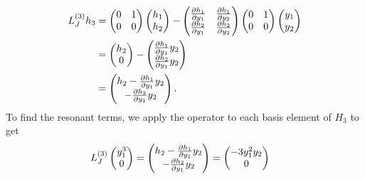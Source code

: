 \documentclass[12pt]{report}
\begin{document}
\begin{solution}
    \begin{align*}
        L_J^{(3)}h_3 &= \begin{pmatrix}
            0  & 1\\ 0 & 0
        \end{pmatrix}\begin{pmatrix}
            h_1 \\ h_2
        \end{pmatrix} - \begin{pmatrix}
            \frac{\partial h_1}{\partial y_1} &  \frac{\partial h_1}{\partial y_2}\\
            \frac{\partial h_2}{\partial y_1} &  \frac{\partial h_2}{\partial y_2}\\
        \end{pmatrix}
        \begin{pmatrix}
            0 & 1\\ 0 & 0
        \end{pmatrix}
        \begin{pmatrix}
            y_1\\y_2
        \end{pmatrix}\\
        &= \begin{pmatrix}
            h_2 \\ 0
        \end{pmatrix} - \begin{pmatrix}
            \frac{\partial h_1}{\partial y_1}y_2\\
            \frac{\partial h_2}{\partial y_1} y_2
        \end{pmatrix}\\
        &=\begin{pmatrix}
            h_2 - \frac{\partial h_1}{\partial y_1}y_2\\
            -\frac{\partial h_2}{\partial y_1} y_2
        \end{pmatrix}.
    \end{align*}
    To find the resonant terms, we apply the operator to each basis element of $H_3$ to get
    \begin{align*}
        L_J^{(3)}
        \begin{pmatrix} 
            y_1^3\\0 
        \end{pmatrix} &= 
        \begin{pmatrix}
            h_2 - \frac{\partial h_1}{\partial y_1}y_2\\
            -\frac{\partial h_2}{\partial y_1} y_2
        \end{pmatrix} = \begin{pmatrix}
            -3y_1^2y_2 \\ 0

\end{pmatrix}
\end{align*}
\end{solution}
\end{document}
